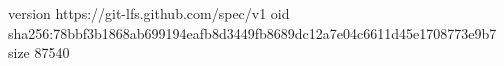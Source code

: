 version https://git-lfs.github.com/spec/v1
oid sha256:78bbf3b1868ab699194eafb8d3449fb8689dc12a7e04c6611d45e1708773e9b7
size 87540
